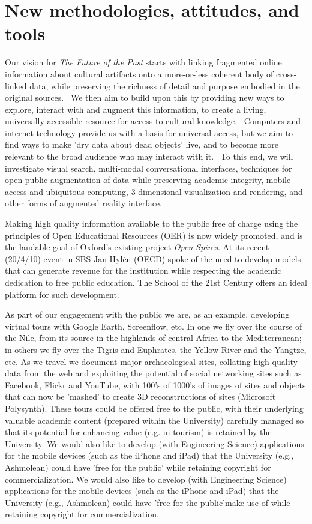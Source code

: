 \documentclass[11pt,twoside]{article}\makeatletter
\makeatletter
\renewcommand\section{\@startsection {section}{1}{\z@}%
     {-1.75ex \@plus -0.5ex \@minus -.2ex}%
     {0.5ex \@plus .2ex}%
     {\reset@font\Large\bfseries\sffamily}}
\def\DivI{\section}
\def\DivI{\chapter}
\makeatother
\begin{document}
\DivI[New methodologies, attitudes, and tools]{New methodologies, attitudes, and tools}\par Our vision for \textit{The Future of the Past} starts with linking fragmented online information about cultural artifacts onto a more-or-less coherent body of cross-linked data, while preserving the richness of detail and purpose embodied in the original sources.  We then aim to build upon this by providing new ways to explore, interact with and augment this information, to create a living, universally accessible resource for access to cultural knowledge.  Computers and internet technology provide us with a basis for universal access, but we aim to find ways to make 'dry data about dead objects' live, and to become more relevant to the broad audience who may interact with it.  To this end, we will investigate visual search, multi-modal conversational interfaces, techniques for open public augmentation of data while preserving academic integrity, mobile access and ubiquitous computing, 3-dimensional visualization and rendering, and other forms of augmented reality interface. \par Making high quality information available to the public free of charge using the principles of Open Educational Resources (OER) is now widely promoted, and is the laudable goal of Oxford’s existing project \textit{Open Spires}. At its recent (20/4/10) event in SBS Jan Hylėn (OECD) spoke of the need to develop models that can generate revenue for the institution while respecting the academic dedication to free public education. The School of the 21st Century offers an ideal platform for such development. \par As part of our engagement with the public we are, as an example, developing virtual tours with Google Earth, Screenflow, etc. In one we fly over the course of the Nile, from its source in the highlands of central Africa to the Mediterranean; in others we fly over the Tigris and Euphrates, the Yellow River and the Yangtze, etc. As we travel we document major archaeological sites, collating high quality data from the web and exploiting the potential of social networking sites such as Facebook, Flickr and YouTube, with 100's of 1000's of images of sites and objects that can now be 'mashed' to create 3D reconstructions of sites (Microsoft Polysynth). These tours could be offered free to the public, with their underlying valuable academic content (prepared within the University) carefully managed so that its potential for enhancing value (e.g. in tourism) is retained by the University. We would also like to develop (with Engineering Science) applications for the mobile devices (such as the iPhone and iPad) that the University (e.g., Ashmolean) could have 'free for the public' while retaining copyright for commercialization. We would also like to develop (with Engineering Science) applications for the mobile devices (such as the iPhone and iPad) that the University (e.g., Ashmolean) could have 'free for the public'make use of while retaining copyright for commercialization.
\end{document}
